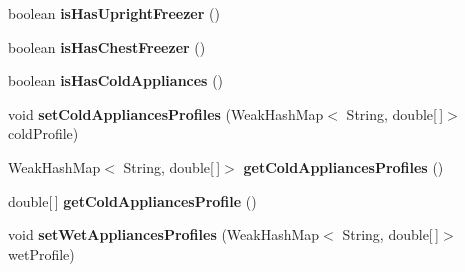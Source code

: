 \begin{DoxyCompactItemize}
\item 
\hypertarget{classuk_1_1ac_1_1dmu_1_1iesd_1_1cascade_1_1agents_1_1prosumers_1_1_household_prosumer_af475beff4edff682262e924d654ab52f}{boolean {\bfseries is\-Has\-Upright\-Freezer} ()}\label{classuk_1_1ac_1_1dmu_1_1iesd_1_1cascade_1_1agents_1_1prosumers_1_1_household_prosumer_af475beff4edff682262e924d654ab52f}

\item 
\hypertarget{classuk_1_1ac_1_1dmu_1_1iesd_1_1cascade_1_1agents_1_1prosumers_1_1_household_prosumer_a6e2f50996ebc38c61aa3eec5575dd12b}{boolean {\bfseries is\-Has\-Chest\-Freezer} ()}\label{classuk_1_1ac_1_1dmu_1_1iesd_1_1cascade_1_1agents_1_1prosumers_1_1_household_prosumer_a6e2f50996ebc38c61aa3eec5575dd12b}

\item 
\hypertarget{classuk_1_1ac_1_1dmu_1_1iesd_1_1cascade_1_1agents_1_1prosumers_1_1_household_prosumer_a55df1b513b980819996f62c279f4882e}{boolean {\bfseries is\-Has\-Cold\-Appliances} ()}\label{classuk_1_1ac_1_1dmu_1_1iesd_1_1cascade_1_1agents_1_1prosumers_1_1_household_prosumer_a55df1b513b980819996f62c279f4882e}

\item 
\hypertarget{classuk_1_1ac_1_1dmu_1_1iesd_1_1cascade_1_1agents_1_1prosumers_1_1_household_prosumer_ab56e7f80c4a07b9f1a2be6f8329f7c3f}{void {\bfseries set\-Cold\-Appliances\-Profiles} (Weak\-Hash\-Map$<$ String, double\mbox{[}$\,$\mbox{]}$>$ cold\-Profile)}\label{classuk_1_1ac_1_1dmu_1_1iesd_1_1cascade_1_1agents_1_1prosumers_1_1_household_prosumer_ab56e7f80c4a07b9f1a2be6f8329f7c3f}

\item 
\hypertarget{classuk_1_1ac_1_1dmu_1_1iesd_1_1cascade_1_1agents_1_1prosumers_1_1_household_prosumer_ac75543cf2cd0103121f53886df5e09d5}{Weak\-Hash\-Map$<$ String, double\mbox{[}$\,$\mbox{]}$>$ {\bfseries get\-Cold\-Appliances\-Profiles} ()}\label{classuk_1_1ac_1_1dmu_1_1iesd_1_1cascade_1_1agents_1_1prosumers_1_1_household_prosumer_ac75543cf2cd0103121f53886df5e09d5}

\item 
\hypertarget{classuk_1_1ac_1_1dmu_1_1iesd_1_1cascade_1_1agents_1_1prosumers_1_1_household_prosumer_a3f2998c27dd477593774280f1f868114}{double\mbox{[}$\,$\mbox{]} {\bfseries get\-Cold\-Appliances\-Profile} ()}\label{classuk_1_1ac_1_1dmu_1_1iesd_1_1cascade_1_1agents_1_1prosumers_1_1_household_prosumer_a3f2998c27dd477593774280f1f868114}

\item 
\hypertarget{classuk_1_1ac_1_1dmu_1_1iesd_1_1cascade_1_1agents_1_1prosumers_1_1_household_prosumer_ad6bf8af30d14433e5270b36abcee1884}{void {\bfseries set\-Wet\-Appliances\-Profiles} (Weak\-Hash\-Map$<$ String, double\mbox{[}$\,$\mbox{]}$>$ wet\-Profile)}\label{classuk_1_1ac_1_1dmu_1_1iesd_1_1cascade_1_1agents_1_1prosumers_1_1_household_prosumer_ad6bf8af30d14433e5270b36abcee1884}


\end{DoxyCompactItemize}

